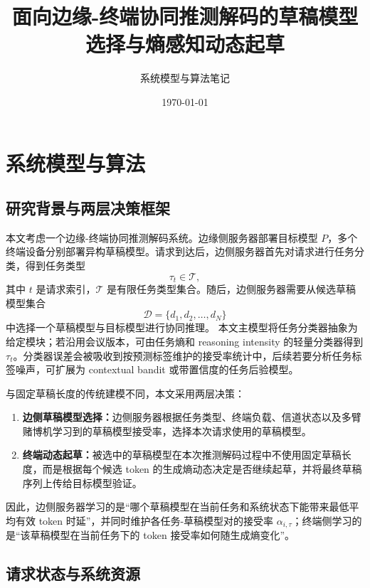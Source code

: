 \documentclass[11pt,a4paper]{ctexart}
\title{面向边缘-终端协同推测解码的草稿模型选择与熵感知动态起草}
\author{系统模型与算法笔记}
\date{\today}
\begin{document}
\maketitle

\section{系统模型与算法}
\label{sec:system_model_algorithm}

\subsection{研究背景与两层决策框架}
\label{subsec:background}

本文考虑一个边缘-终端协同推测解码系统。边缘侧服务器部署目标模型 $P$，多个终端设备分别部署异构草稿模型。请求到达后，边侧服务器首先对请求进行任务分类，得到任务类型
\begin{equation}
    \tau_t\in\mathcal{T},
\end{equation}
其中 $t$ 是请求索引，$\mathcal{T}$ 是有限任务类型集合。随后，边侧服务器需要从候选草稿模型集合
\begin{equation}
    \mathcal{D}=\{d_1,d_2,\ldots,d_N\}
\end{equation}
中选择一个草稿模型与目标模型进行协同推理。
本文主模型将任务分类器抽象为给定模块；若沿用会议版本，可由任务熵和 reasoning intensity 的轻量分类器得到 $\tau_t$。分类器误差会被吸收到按预测标签维护的接受率统计中，后续若要分析任务标签噪声，可扩展为 contextual bandit 或带置信度的任务后验模型。

与固定草稿长度的传统建模不同，本文采用两层决策：
\begin{enumerate}[leftmargin=*]
    \item \textbf{边侧草稿模型选择：}边侧服务器根据任务类型、终端负载、信道状态以及多臂赌博机学习到的草稿模型接受率，选择本次请求使用的草稿模型。
    \item \textbf{终端动态起草：}被选中的草稿模型在本次推测解码过程中不使用固定草稿长度，而是根据每个候选 token 的生成熵动态决定是否继续起草，并将最终草稿序列上传给目标模型验证。
\end{enumerate}

因此，边侧服务器学习的是“哪个草稿模型在当前任务和系统状态下能带来最低平均有效 token 时延”，并同时维护各任务-草稿模型对的接受率 $\alpha_{i,\tau}$；终端侧学习的是“该草稿模型在当前任务下的 token 接受率如何随生成熵变化”。

\subsection{请求状态与系统资源}
\label{subsec:state}
\end{document}

